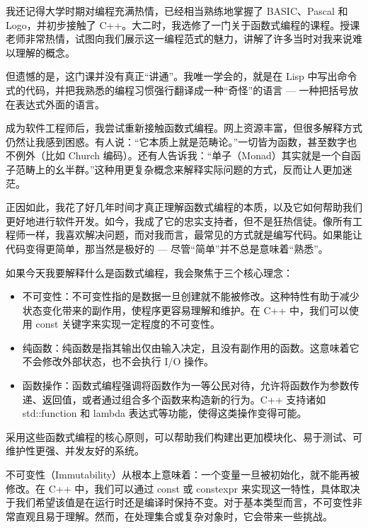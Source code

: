
我还记得大学时期对编程充满热情，已经相当熟练地掌握了 BASIC、Pascal 和 Logo，并初步接触了 C++。大二时，我选修了一门关于函数式编程的课程。授课老师非常热情，试图向我们展示这一编程范式的魅力，讲解了许多当时对我来说难以理解的概念。

但遗憾的是，这门课并没有真正“讲通”。我唯一学会的，就是在 Lisp 中写出命令式的代码，并把我熟悉的编程习惯强行翻译成一种“奇怪”的语言 --- 一种把括号放在表达式外面的语言。

成为软件工程师后，我尝试重新接触函数式编程。网上资源丰富，但很多解释方式仍然让我感到困惑。有人说：“它本质上就是范畴论。”一切皆为函数，甚至数字也不例外（比如 Church 编码）。还有人告诉我：“单子（Monad）其实就是一个自函子范畴上的幺半群。”这种用更复杂概念来解释实际问题的方式，反而让人更加迷茫。

正因如此，我花了好几年时间才真正理解函数式编程的本质，以及它如何帮助我们更好地进行软件开发。如今，我成了它的忠实支持者，但不是狂热信徒。像所有工程师一样，我喜欢解决问题，而对我而言，最常见的方式就是编写代码。如果能让代码变得更简单，那当然是极好的 --- 尽管“简单”并不总是意味着“熟悉”。

如果今天我要解释什么是函数式编程，我会聚焦于三个核心理念： 

\begin{itemize}
\item 
不可变性：不可变性指的是数据一旦创建就不能被修改。这种特性有助于减少状态变化带来的副作用，使程序更容易理解和维护。在 C++ 中，我们可以使用 const 关键字来实现一定程度的不可变性。

\item 
纯函数：纯函数是指其输出仅由输入决定，且没有副作用的函数。这意味着它不会修改外部状态，也不会执行 I/O 操作。

\item 
函数操作：函数式编程强调将函数作为一等公民对待，允许将函数作为参数传递、返回值，或者通过组合多个函数来构造新的行为。C++ 支持诸如 std::function 和 lambda 表达式等功能，使得这类操作变得可能。 
\end{itemize}

采用这些函数式编程的核心原则，可以帮助我们构建出更加模块化、易于测试、可维护性更强、并发友好的系统。


不可变性（Immutability）从根本上意味着：一个变量一旦被初始化，就不能再被修改。在 C++ 中，我们可以通过 const 或 constexpr 来实现这一特性，具体取决于我们希望该值是在运行时还是编译时保持不变。对于基本类型而言，不可变性非常直观且易于理解。然而，在处理集合或复杂对象时，它会带来一些挑战。

